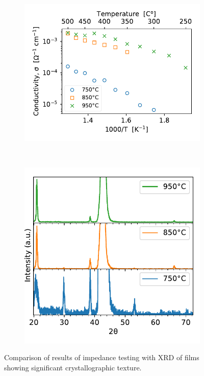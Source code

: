 \begin{figure}
    \begin{subfigure}{.9\linewidth}
        \centering
        \includegraphics{Figures/181008-PraxBZG-film-comparison-air.pdf}
        \caption{}
        \label{fig:film:eis:eis_xrd_comparison}
    \end{subfigure}
    \\
    \vspace{.125in}
    \begin{subfigure}{.9\linewidth}
        \centering
        \includegraphics{Figures/181008-PraxBZG-film-comparison-xrd-zoom.pdf}
        \caption{}
        \label{fig:film:xrd:eis_xrd_comparison}
    \end{subfigure}
    \caption{Comparison of results of impedance testing with XRD of films showing significant crystallographic texture.}
\end{figure}
